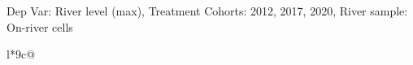 \begin{table}[H]
\captionlistentry[table]{}
\label{table:beaver_hydrometry_DVlevel_max_SCg123}
\tiny %
Dep Var: River level (max), Treatment Cohorts: 2012, 2017, 2020, River sample: On-river cells \\
\begin{threeparttable}
\begin{tabulary}{\textwidth}{l*{9}{c}@{}}
\toprule \toprule
\noalign{\smallskip}
\noalign{\smallskip}
\midrule \bottomrule
\end{tabulary}
\medskip
\end{threeparttable}
\end{table}
